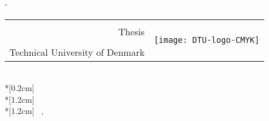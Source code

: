 
\thispagestyle{empty}             %
\calccentering{\unitlength}
\begin{adjustwidth*}{\unitlength}{-\unitlength}
    \begin{adjustwidth}{-0.5cm}{-0.5cm}
        \scshape
        \begin{flushright}
            \scriptsize  %
            \def\arraystretch{1.2}
            \begin{tabular}{rc}
            & \multirow{4}{*}{\texttt{[image: DTU-logo-CMYK]}}\\[-0.1cm]
            \thesistypeabbr{} Thesis & \\
            \thesistype{} & \\
            Technical University of Denmark &
            \end{tabular}        
        \end{flushright}
        \vspace*{\fill}
        \begin{center}
        {\color{dtured}\noindent\large\thesistitle}\\*[0.2cm]
        \large{\thesissubtitle}\\*[1.2cm]
            \normalsize
            \thesisauthor\\*[1.2cm]
            \thesismonth\ \thesisyear, \thesislocation
        \end{center}
        \vspace*{\fill}
    \end{adjustwidth}
\end{adjustwidth*}
\normalfont
\normalsize
